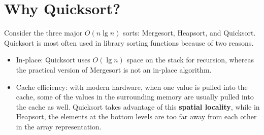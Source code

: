 \documentclass[11pt]{article}
\begin{document}
\section{Why Quicksort?}
	Consider the three major $O(n\lg n)$ sorts: Mergesort, Heapsort, and Quicksort. Quicksort is most often used in library sorting functions because of two reasons.
	\begin{itemize}
		\item In-place: Quicksort uses $O(\lg n)$ space on the stack for recursion, whereas the practical version of Mergesort is not an in-place algorithm.
		\item Cache efficiency: with modern hardware, when one value is pulled into the cache, some of the values in the surrounding memory are usually pulled into the cache as well. Quicksort takes advantage of this \textbf{spatial locality}, while in Heapsort, the elements at the bottom levels are too far away from each other in the array representation.
	\end{itemize}
\end{document}
